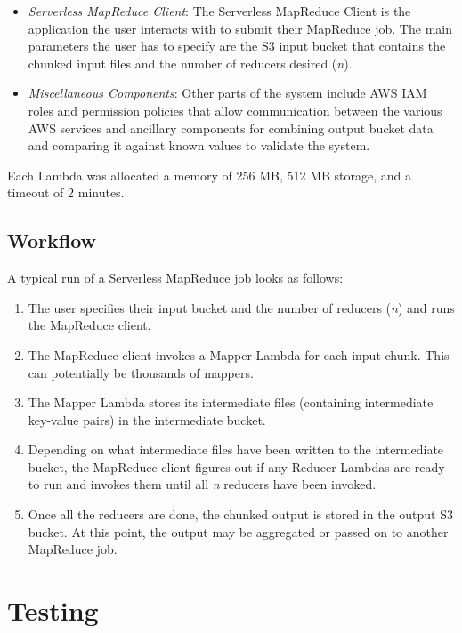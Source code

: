 \begin{itemize}
    \item \emph{Serverless MapReduce Client}: The Serverless MapReduce Client is the application the user interacts with to submit their MapReduce job. The main parameters the user has to specify are the S3 input bucket that contains the chunked input files and the number of reducers desired (\emph{n}).

    \item \emph{Miscellaneous Components}: Other parts of the system include AWS IAM roles and permission policies that allow communication between the various AWS services and ancillary components for combining output bucket data and comparing it against known values to validate the system.
\end{itemize}

Each Lambda was allocated a memory of 256 MB, 512 MB storage, and a timeout of 2 minutes.

\subsection{Workflow}

A typical run of a Serverless MapReduce job looks as follows:

\begin{enumerate}
    \item The user specifies their input bucket and the number of reducers (\emph{n}) and runs the MapReduce client.
    \item The MapReduce client invokes a Mapper Lambda for each input chunk. This can potentially be thousands of mappers.
    \item The Mapper Lambda stores its intermediate files (containing intermediate key-value pairs) in the intermediate bucket.
    \item Depending on what intermediate files have been written to the intermediate bucket, the MapReduce client figures out if any Reducer Lambdas are ready to run and invokes them until all \emph{n} reducers have been invoked.
    \item Once all the reducers are done, the chunked output is stored in the output S3 bucket. At this point, the output may be aggregated or passed on to another MapReduce job.
\end{enumerate}

\section{Testing}

